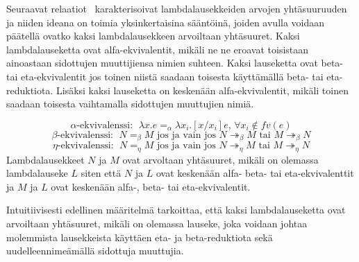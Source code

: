 \par

%

Seuraavat relaatiot~\cite[s.~23--24]{HBEB2000} karakterisoivat lambdalausekkeiden arvojen yhtäsuuruuden ja niiden ideana on toimia yksinkertaisina sääntöinä, joiden avulla voidaan päätellä ovatko kaksi lambdalausekkeen arvoiltaan yhtäsuuret. Kaksi lambdalauseketta ovat alfa-ekvivalentit, mikäli ne ne eroavat toisistaan ainoastaan sidottujen muuttijiensa nimien suhteen. Kaksi lauseketta ovat beta- tai eta-ekvivalentit jos toinen niistä saadaan toisesta käyttämällä beta- tai eta-reduktiota. Lisäksi kaksi lauseketta on keskenään alfa-ekvivalentit, mikäli toinen saadaan toisesta vaihtamalla sidottujen muuttujien nimiä.

\begin{maar}
		 
\[ 
	\alpha \text{-ekvivalenssi: } \; \lambda x.e =_{\alpha} \lambda x_{i}.		[x/x_{i}]e \text{,  } \forall x_{i} \notin fv(e) 
\]
\[ 
	\beta \text{-ekvivalenssi: } \; N =_{\beta} M \text{ jos ja vain jos } N 		\twoheadrightarrow_{\beta} M \text{ tai }
	M \twoheadrightarrow_{\beta} N 
\]
\[ 
	\eta \text{-ekvivalenssi: } \; N =_{\eta} M \text{ jos ja vain jos } N 		\twoheadrightarrow_{\eta} M \text{ tai }
	M \twoheadrightarrow_{\eta} N 
\]
Lambdalausekkeet $N$ ja $M$ ovat arvoltaan yhtäsuuret, mikäli	on olemassa lambdalauseke $L$ siten että $N$ ja $L$ ovat keskenään alfa- beta- tai eta-ekvivalenttit ja $M$ ja $L$ ovat keskenään alfa-, beta- tai eta-ekvivalentit.	
\end{maar}

Intuitiivisesti edellinen määritelmä tarkoittaa, että kaksi lambdalauseketta ovat arvoiltaan yhtäsuuret, mikäli on olemassa lauseke, joka voidaan johtaa molemmista lausekkeista käyttäen eta- ja beta-reduktiota sekä uudelleennimeämällä sidottuja muuttujia. 


 

